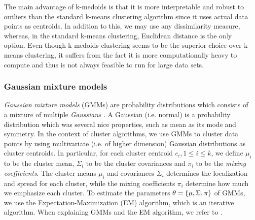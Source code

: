 The main advantage of k-medoids is that it is more interpretable and robust to outliers than the standard k-means clustering algorithm since it uses actual data points as centroids. In addition to this, we may use any dissimilarity measure, whereas, in the standard k-means clustering, Euclidean distance is the only option. Even though k-medoids clustering seems to be the superior choice over k-means clustering, it suffers from the fact it is more computationally heavy to compute and thus is not always feasible to run for large data sets.

\subsubsection{Gaussian mixture models}
\label{sec:gmm-clustering}
\textit{Gaussian mixture models} (GMMs) are probability distributions which consists of a mixture of multiple \textit{Gaussians} \cite[Section 9.2]{bishop2006}. A Gaussian (i.e. normal) is a probability distribution which was several nice properties, such as mean as its mode and symmetry. In the context of cluster algorithms, we use GMMs to cluster data points by using multivariate (i.e. of higher dimension) Gaussian distributions as cluster centroids. In particular, for each cluster centroid $c_i, 1 \leq i \leq k$, we define $\mu_i$ to be the cluster mean, $\Sigma_i$ to be the cluster covariances and $\pi_i$ to be the \textit{mixing coefficients}. The cluster means $\mu_i$ and covariances $\Sigma_i$ determines the localization and spread for each cluster, while the mixing coefficients $\pi_i$ determine how much we emphasize each cluster. To estimate the parameters $\theta = \left\{\mu, \Sigma, \pi\right\}$ of GMMs, we use the Expectation-Maximization (EM) algorithm, which is an iterative algorithm. When explaining GMMs and the EM algorithm, we refer to \cite[Section 9.2]{bishop2006}.

